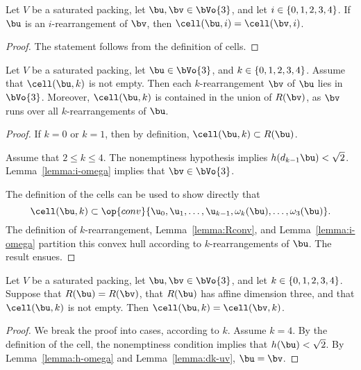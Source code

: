 \begin{cnl}
\begin{lemma}[]
\label{lemma:marchal-equal} 
%
Let $V$ be a saturated packing, 
let $\bu,\bv\in \bVo{3}$, and let $i\in \{0,1,2,3,4\}$.
If $\bu$ is an $i$-rearrangement of $\bv$, 
then $\cell(\bu,i)=\cell(\bv,i)$.
\end{lemma}


\begin{proof} 
The  statement follows from the definition of cells.
\end{proof}


\begin{lemma}[]
\label{lemma:cell-in-rogers} %
%
Let $V$ be a saturated packing, let $\bu\in \bVo{3}$, and $k\in
\{0,1,2,3,4\}$.  Assume that $\cell(\bu,k)$ is not empty.  Then
each $k$-rearrangement $\bv$ of $\bu$ lies in $\bVo{3}$.  Moreover,
$\cell(\bu,k)$ is contained in the union of $R(\bv)$, as $\bv$ runs
over all $k$-rearrangements of $\bu$.
\end{lemma}


\begin{proof}  If $k=0$ or $k=1$, 
then by definition, $\cell(\bu,k)\subset R(\bu)$.

Assume that  $2\le k\le 4$.  The nonemptiness hypothesis
implies $h(d_{k-1}\bu)<\sqrt2$.  Lemma~\ref{lemma:i-omega} implies
that $\bv\in \bVo{3}$.

The definition of the cells can be used to show directly that
\[
\cell(\bu,k)\subset 
\op{conv}\{\u_0,\u_1,\ldots,\u_{k-1},\omega_{k}(\bu),\ldots,
\omega_3(\bu)\}.
\]
The definition of $k$-rearrangement, Lemma~\ref{lemma:Rconv}, and
Lemma~\ref{lemma:i-omega} partition this convex hull according to
$k$-rearrangements of $\bu$.  The result ensues.
\end{proof}

\begin{lemma}[]
\label{lemma:cell-disjoint} %
%
Let $V$ be a saturated packing, let $\bu,\bv\in \bVo{3}$, and let
$k\in \{0,1,2,3,4\}$.  Suppose that $R(\bu)=R(\bv)$, that
$R(\bu)$ has affine dimension three, and that $\cell(\bu,k)$ is not
empty.  Then $\cell(\bu,k)=\cell(\bv,k)$.
\end{lemma}

\begin{proof} 
We break the proof into cases, according to $k$.  Assume $k=4$.  By
the definition of the cell, the nonemptiness condition implies that
$h(\bu)<\sqrt2$.  By Lemma~\ref{lemma:h-omega} and
Lemma~\ref{lemma:dk-uv}, $\bu=\bv$.


\end{proof}
\end{cnl}
